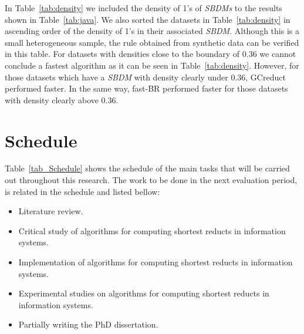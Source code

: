 \documentclass[authoryear,11pt]{elsarticle}
\begin{document}
  In Table~\ref{tab:density} we included the density of 1's of \textit{SBDMs} to the results shown in Table~\ref{tab:java}. We also sorted the datasets in Table~\ref{tab:density} in ascending order of the density of 1's in their associated \textit{SBDM}. Although this is a small heterogeneous sample, the rule obtained from synthetic data can be verified in this table. For datasets with densities close to the boundary of 0.36 we cannot conclude a fastest algorithm as it can be seen in Table~\ref{tab:density}. However, for those datasets which have a \textit{SBDM} with density clearly under 0.36, GCreduct performed faster. In the same way, fast-BR performed faster for those datasets with density clearly above 0.36.

\section{Schedule}\label{sec_schedule}
  Table~\ref{tab_Schedule} shows the schedule of the main tasks that will be carried out throughout this research. The work to be done in the next evaluation period, is related in the schedule and listed bellow:
  
  \begin{itemize}
  	\itemsep0em 
  	\item Literature review.
  	\item Critical study of algorithms for computing shortest reducts in information systems.
  	\item Implementation of algorithms for computing shortest reducts in information systems.
  	\item Experimental studies on algorithms for computing shortest reducts in information systems.
  	\item Partially writing the PhD dissertation.
  \end{itemize}
  
\end{document}
